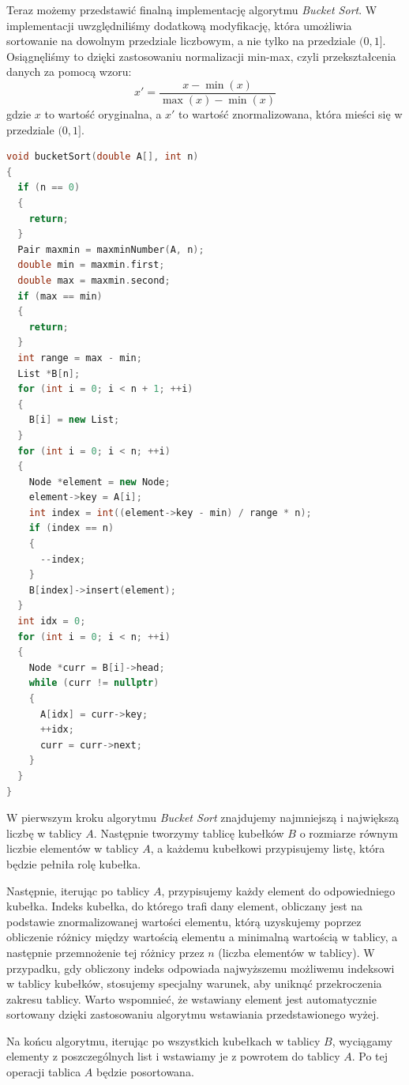 \documentclass{article}
\begin{document}
Teraz możemy przedstawić finalną implementację algorytmu \textit{Bucket Sort}. W implementacji uwzględniliśmy dodatkową modyfikację, która umożliwia sortowanie na dowolnym przedziale liczbowym, a nie tylko na przedziale $(0, 1]$. Osiągnęliśmy to dzięki zastosowaniu normalizacji min-max, czyli przekształcenia danych za pomocą wzoru:
\[
    x' = \frac{x - \min(x)}{\max(x) - \min(x)}
\]
gdzie $x$ to wartość oryginalna, a $x'$ to wartość znormalizowana, która mieści się w przedziale $(0, 1]$.
\newpage
\begin{lstlisting}[style=mystyle, language=C++, caption={Implementacja \texttt{Bucket Sort}}, label={lst:bucketsort}]
void bucketSort(double A[], int n)
{
  if (n == 0)
  {
    return;
  }
  Pair maxmin = maxminNumber(A, n);
  double min = maxmin.first;
  double max = maxmin.second;
  if (max == min)
  {
    return;
  }
  int range = max - min;
  List *B[n];
  for (int i = 0; i < n + 1; ++i)
  {
    B[i] = new List;
  }
  for (int i = 0; i < n; ++i)
  {
    Node *element = new Node;
    element->key = A[i];
    int index = int((element->key - min) / range * n);
    if (index == n)
    {
      --index;
    }
    B[index]->insert(element);
  }
  int idx = 0;
  for (int i = 0; i < n; ++i)
  {
    Node *curr = B[i]->head;
    while (curr != nullptr)
    {
      A[idx] = curr->key;
      ++idx;
      curr = curr->next;
    }
  }
}
\end{lstlisting}

W pierwszym kroku algorytmu \textit{Bucket Sort} znajdujemy najmniejszą i największą liczbę w tablicy $A$. Następnie tworzymy tablicę kubełków $B$ o rozmiarze równym liczbie elementów w tablicy $A$, a każdemu kubełkowi przypisujemy listę, która będzie pełniła rolę kubełka.

Następnie, iterując po tablicy $A$, przypisujemy każdy element do odpowiedniego kubełka. Indeks kubełka, do którego trafi dany element, obliczany jest na podstawie znormalizowanej wartości elementu, którą uzyskujemy poprzez obliczenie różnicy między wartością elementu a minimalną wartością w tablicy, a następnie przemnożenie tej różnicy przez $n$ (liczba elementów w tablicy). W przypadku, gdy obliczony indeks odpowiada najwyższemu możliwemu indeksowi w tablicy kubełków, stosujemy specjalny warunek, aby uniknąć przekroczenia zakresu tablicy. Warto wspomnieć, że wstawiany element jest automatycznie sortowany dzięki zastosowaniu algorytmu wstawiania przedstawionego wyżej.

Na końcu algorytmu, iterując po wszystkich kubełkach w tablicy $B$, wyciągamy elementy z poszczególnych list i wstawiamy je z powrotem do tablicy $A$. Po tej operacji tablica $A$ będzie posortowana.
\end{document}
